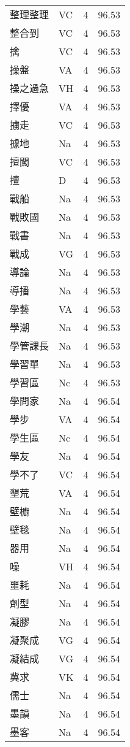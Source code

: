 \documentclass[twocolumn]{book}
\begin{document}
\begin{supertabular}{llrr}
整理整理 & VC & 4 &  96.53\\
整合到 & VC & 4 &  96.53\\
擒 & VC & 4 &  96.53\\
操盤 & VA & 4 &  96.53\\
操之過急 & VH & 4 &  96.53\\
擇優 & VA & 4 &  96.53\\
擄走 & VC & 4 &  96.53\\
據地 & Na & 4 &  96.53\\
擅闖 & VC & 4 &  96.53\\
擅 & D & 4 &  96.53\\
戰船 & Na & 4 &  96.53\\
戰敗國 & Na & 4 &  96.53\\
戰書 & Na & 4 &  96.53\\
戰成 & VG & 4 &  96.53\\
導論 & Na & 4 &  96.53\\
導播 & Na & 4 &  96.53\\
學藝 & VA & 4 &  96.53\\
學潮 & Na & 4 &  96.53\\
學管課長 & Na & 4 &  96.53\\
學習單 & Na & 4 &  96.53\\
學習區 & Nc & 4 &  96.53\\
學問家 & Na & 4 &  96.54\\
學步 & VA & 4 &  96.54\\
學生區 & Nc & 4 &  96.54\\
學友 & Na & 4 &  96.54\\
學不了 & VC & 4 &  96.54\\
墾荒 & VA & 4 &  96.54\\
壁櫥 & Na & 4 &  96.54\\
壁毯 & Na & 4 &  96.54\\
器用 & Na & 4 &  96.54\\
噪 & VH & 4 &  96.54\\
噩耗 & Na & 4 &  96.54\\
劑型 & Na & 4 &  96.54\\
凝膠 & Na & 4 &  96.54\\
凝聚成 & VG & 4 &  96.54\\
凝結成 & VG & 4 &  96.54\\
冀求 & VK & 4 &  96.54\\
儒士 & Na & 4 &  96.54\\
墨韻 & Na & 4 &  96.54\\
墨客 & Na & 4 &  96.54\\

\end{supertabular}
\end{document}
